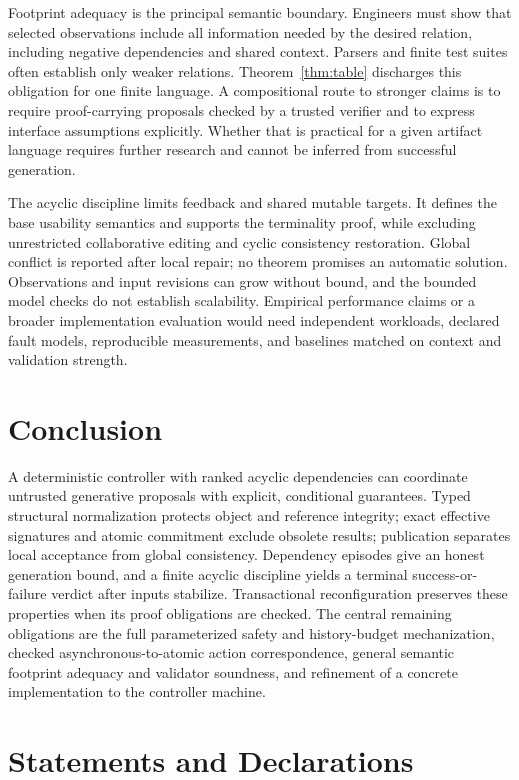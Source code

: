 \documentclass[pdflatex,sn-mathphys-num]{sn-jnl}
\theoremstyle{thmstyleone}
\theoremstyle{thmstylethree}
\theoremstyle{thmstyletwo}
\begin{document}
Footprint adequacy is the principal semantic boundary. Engineers must show that selected observations include all information needed by the desired relation, including negative dependencies and shared context. Parsers and finite test suites often establish only weaker relations. Theorem~\ref{thm:table} discharges this obligation for one finite language. A compositional route to stronger claims is to require proof-carrying proposals checked by a trusted verifier and to express interface assumptions explicitly. Whether that is practical for a given artifact language requires further research and cannot be inferred from successful generation.

The acyclic discipline limits feedback and shared mutable targets. It defines the base usability semantics and supports the terminality proof, while excluding unrestricted collaborative editing and cyclic consistency restoration. Global conflict is reported after local repair; no theorem promises an automatic solution. Observations and input revisions can grow without bound, and the bounded model checks do not establish scalability. Empirical performance claims or a broader implementation evaluation would need independent workloads, declared fault models, reproducible measurements, and baselines matched on context and validation strength.

\section{Conclusion}
A deterministic controller with ranked acyclic dependencies can coordinate untrusted generative proposals with explicit, conditional guarantees. Typed structural normalization protects object and reference integrity; exact effective signatures and atomic commitment exclude obsolete results; publication separates local acceptance from global consistency. Dependency episodes give an honest generation bound, and a finite acyclic discipline yields a terminal success-or-failure verdict after inputs stabilize. Transactional reconfiguration preserves these properties when its proof obligations are checked. The central remaining obligations are the full parameterized safety and history-budget mechanization, checked asynchronous-to-atomic action correspondence, general semantic footprint adequacy and validator soundness, and refinement of a concrete implementation to the controller machine.

\section*{Statements and Declarations}
\end{document}
